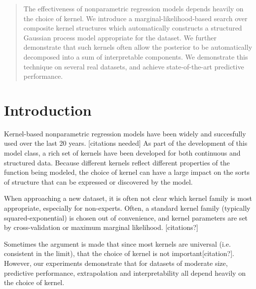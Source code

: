 \documentclass[twoside]{article}
\begin{document}


\begin{abstract}
The effectiveness of nonparametric regression models depends heavily on the choice of kernel.
We introduce a marginal-likelihood-based search over composite kernel structures which automatically constructs a structured Gaussian process model appropriate for the dataset.
We further demonstrate that such kernels often allow the posterior to be automatically decomposed into a sum of interpretable components.
We demonstrate this technique on several real datasets, and achieve state-of-the-art predictive performance.
\end{abstract}

\section{Introduction}

Kernel-based nonparametric regression models have been widely and succesfully used over the last 20 years. [citations needed]
As part of the development of this model class, a rich set of kernels have been developed for both continuous and structured data.
Because different kernels reflect different properties of the function being modeled, the choice of kernel can have a large impact on the sorts of structure that can be expressed or discovered by the model.

When approaching a new dataset, it is often not clear which kernel family is most appropriate, especially for non-experts.
Often, a standard kernel family (typically squared-exponential) is chosen out of convenience, and kernel parameters are set by cross-validation or maximum marginal likelihood. [citations?]

Sometimes the argument is made that since most kernels are universal (i.e. consistent in the limit), that the choice of kernel is not important[citation?].  However, our experiments demonstrate that for datasets of moderate size, predictive performance, extrapolation and interpretability all depend heavily on the choice of kernel.
\end{document}
